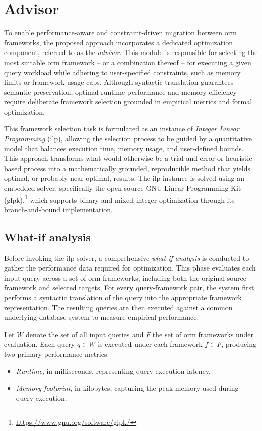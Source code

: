 \chapter{Advisor}\label{chapter:advisor}

To enable performance-aware and constraint-driven migration between \acrshort{orm} frameworks, the proposed approach incorporates a dedicated optimization component, referred to as the \emph{advisor}. This module is responsible for selecting the most suitable \acrshort{orm} framework -- or a combination thereof -- for executing a given query workload while adhering to user-specified constraints, such as memory limits or framework usage caps. Although syntactic translation guarantees semantic preservation, optimal runtime performance and memory efficiency require deliberate framework selection grounded in empirical metrics and formal optimization.

This framework selection task is formulated as an instance of \emph{Integer Linear Programming} (\acrshort{ilp}), allowing the selection process to be guided by a quantitative model that balances execution time, memory usage, and user-defined bounds. This approach transforms what would otherwise be a trial-and-error or heuristic-based process into a mathematically grounded, reproducible method that yields optimal, or probably near-optimal, results. The \acrshort{ilp} instance is solved using an embedded solver, specifically the open-source GNU Linear Programming Kit (\acrshort{glpk}),\footnote{\url{https://www.gnu.org/software/glpk/}} which supports binary and mixed-integer optimization through its branch-and-bound implementation.

\section{What-if analysis}

Before invoking the \acrshort{ilp} solver, a comprehensive \emph{what-if analysis} is conducted to gather the performance data required for optimization. This phase evaluates each input query across a set of \acrshort{orm} frameworks, including both the original source framework and selected targets. For every query-framework pair, the system first performs a syntactic translation of the query into the appropriate framework representation. The resulting queries are then executed against a common underlying database system to measure empirical performance.

Let $W $ denote the set of all input queries and $F$ the set of \acrshort{orm} frameworks under evaluation. Each query $q \in W$ is executed under each framework $f \in F$, producing two primary performance metrics:
\begin{itemize}
    \item \textit{Runtime}, in milliseconds, representing query execution latency.
    \item \textit{Memory footprint}, in kilobytes, capturing the peak memory used during query execution.
\end{itemize}

